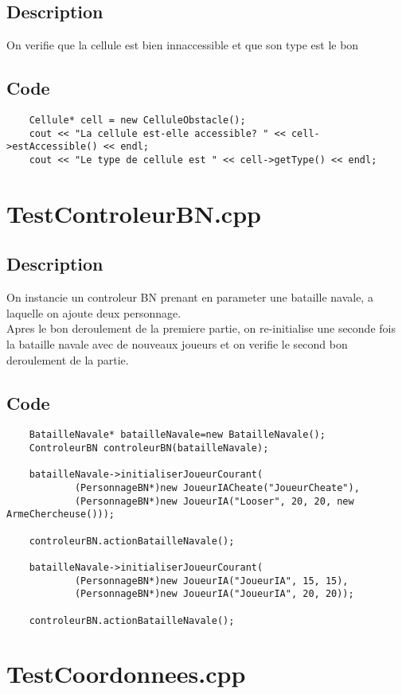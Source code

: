         \subsection{Description}
            On verifie que la cellule est bien innaccessible et que son type est le bon
        \subsection{Code}
\begin{lstlisting}
	Cellule* cell = new CelluleObstacle();
	cout << "La cellule est-elle accessible? " << cell->estAccessible() << endl;
	cout << "Le type de cellule est " << cell->getType() << endl;
	\end{lstlisting}
    \section{TestControleurBN.cpp}
        \subsection{Description}
            On instancie un controleur BN prenant en parameter une bataille navale, a laquelle on ajoute deux personnage.\\
            Apres le bon deroulement de la premiere partie, on re-initialise une seconde fois la bataille navale avec de nouveaux joueurs et on verifie le second bon deroulement de la partie.
        \subsection{Code}
\begin{lstlisting}
	BatailleNavale* batailleNavale=new BatailleNavale();
    ControleurBN controleurBN(batailleNavale);

    batailleNavale->initialiserJoueurCourant(
            (PersonnageBN*)new JoueurIACheate("JoueurCheate"),
            (PersonnageBN*)new JoueurIA("Looser", 20, 20, new ArmeChercheuse()));

    controleurBN.actionBatailleNavale();

    batailleNavale->initialiserJoueurCourant(
            (PersonnageBN*)new JoueurIA("JoueurIA", 15, 15),
            (PersonnageBN*)new JoueurIA("JoueurIA", 20, 20));

    controleurBN.actionBatailleNavale();
	\end{lstlisting}
    \section{TestCoordonnees.cpp}
